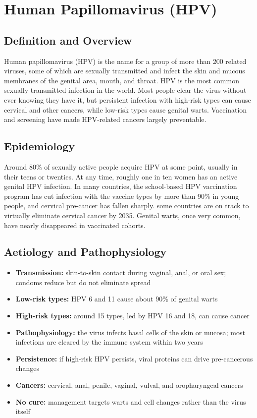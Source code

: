 \chapter{Human Papillomavirus (HPV)}

\section*{Definition and Overview}
Human papillomavirus (HPV) is the name for a group of more than 200 related viruses, some of which are sexually transmitted and infect the skin and mucous membranes of the genital area, mouth, and throat. HPV is the most common sexually transmitted infection in the world. Most people clear the virus without ever knowing they have it, but persistent infection with high-risk types can cause cervical and other cancers, while low-risk types cause genital warts. Vaccination and screening have made HPV-related cancers largely preventable.

\section*{Epidemiology}
Around 80\% of sexually active people acquire HPV at some point, usually in their teens or twenties. At any time, roughly one in ten women has an active genital HPV infection. In many countries, the school-based HPV vaccination program has cut infection with the vaccine types by more than 90\% in young people, and cervical pre-cancer has fallen sharply. some countries are on track to virtually eliminate cervical cancer by 2035. Genital warts, once very common, have nearly disappeared in vaccinated cohorts.

\section*{Aetiology and Pathophysiology}
\begin{itemize}
    \item \textbf{Transmission:} skin-to-skin contact during vaginal, anal, or oral sex; condoms reduce but do not eliminate spread
    \item \textbf{Low-risk types:} HPV 6 and 11 cause about 90\% of genital warts
    \item \textbf{High-risk types:} around 15 types, led by HPV 16 and 18, can cause cancer
    \item \textbf{Pathophysiology:} the virus infects basal cells of the skin or mucosa; most infections are cleared by the immune system within two years
    \item \textbf{Persistence:} if high-risk HPV persists, viral proteins can drive pre-cancerous changes
    \item \textbf{Cancers:} cervical, anal, penile, vaginal, vulval, and oropharyngeal cancers
    \item \textbf{No cure:} management targets warts and cell changes rather than the virus itself
\end{itemize}

